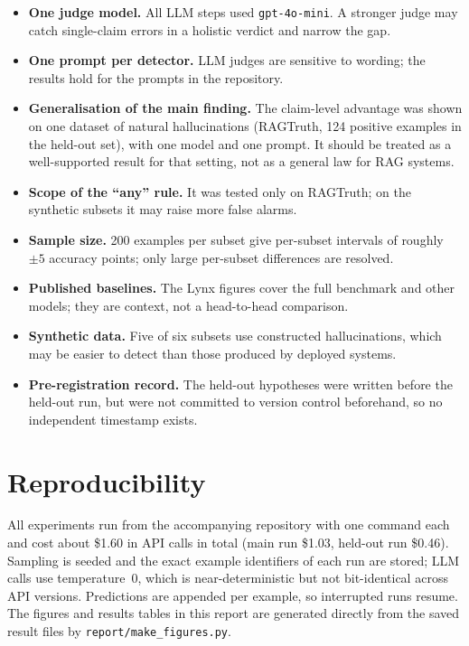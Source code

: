 \documentclass[11pt,a4paper]{article}
\newcommand{\code}[1]{\texttt{\small #1}}
\begin{document}
\begin{itemize}[leftmargin=*]
  \item \textbf{One judge model.} All LLM steps used \code{gpt-4o-mini}. A stronger
        judge may catch single-claim errors in a holistic verdict and narrow the gap.
  \item \textbf{One prompt per detector.} LLM judges are sensitive to wording; the
        results hold for the prompts in the repository.
  \item \textbf{Generalisation of the main finding.} The claim-level advantage was shown
        on one dataset of natural hallucinations (RAGTruth, 124 positive examples in the
        held-out set), with one model and one prompt. It should be treated as a
        well-supported result for that setting, not as a general law for RAG systems.
  \item \textbf{Scope of the ``any'' rule.} It was tested only on RAGTruth; on the
        synthetic subsets it may raise more false alarms.
  \item \textbf{Sample size.} 200 examples per subset give per-subset intervals of
        roughly $\pm5$ accuracy points; only large per-subset differences are resolved.
  \item \textbf{Published baselines.} The Lynx figures cover the full benchmark and
        other models; they are context, not a head-to-head comparison.
  \item \textbf{Synthetic data.} Five of six subsets use constructed hallucinations,
        which may be easier to detect than those produced by deployed systems.
  \item \textbf{Pre-registration record.} The held-out hypotheses were written before
        the held-out run, but were not committed to version control beforehand, so no
        independent timestamp exists.
\end{itemize}

\section{Reproducibility}

All experiments run from the accompanying repository with one command each and cost
about \$1.60 in API calls in total (main run \$1.03, held-out run \$0.46). Sampling is
seeded and the exact example identifiers of each run are stored; LLM calls use
temperature~0, which is near-deterministic but not bit-identical across API versions.
Predictions are appended per example, so interrupted runs resume. The figures and
results tables in this report are generated directly from the saved result files by
\code{report/make\_figures.py}.
\end{document}
